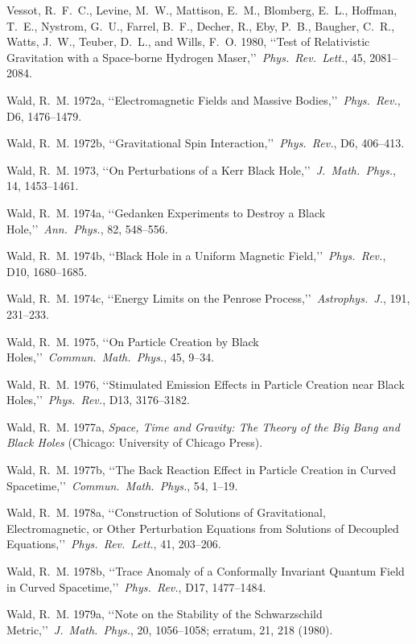 \item Vessot, R.~F.~C., Levine, M.~W., Mattison, E.~M., Blomberg, E.~L., Hoffman, T.~E., Nystrom, G.~U., Farrel, B.~F., Decher, R., Eby, P.~B., Baugher, C.~R., Watts, J.~W., Teuber, D.~L., and Wills, F.~O. 1980, \lq\lq Test of Relativistic Gravitation with a Space-borne Hydrogen Maser,\rq\rq\ \emph{Phys.\ Rev.\ Lett.}, 45, 2081--2084.
\item Wald, R.~M. 1972a, \lq\lq Electromagnetic Fields and Massive Bodies,\rq\rq\ \emph{Phys.\ Rev.}, D6, 1476--1479.
\item Wald, R.~M. 1972b, \lq\lq Gravitational Spin Interaction,\rq\rq\ \emph{Phys.\ Rev.}, D6, 406--413.
\item Wald, R.~M. 1973, \lq\lq On Perturbations of a Kerr Black Hole,\rq\rq\ \emph{J.\ Math.\ Phys.}, 14, 1453--1461.
\item Wald, R.~M. 1974a, \lq\lq Gedanken Experiments to Destroy a Black Hole,\rq\rq\ \emph{Ann.\ Phys.}, 82, 548--556.
\item Wald, R.~M. 1974b, \lq\lq Black Hole in a Uniform Magnetic Field,\rq\rq\ \emph{Phys.\ Rev.}, D10, 1680--1685.
\item Wald, R.~M. 1974c, \lq\lq Energy Limits on the Penrose Process,\rq\rq\ \emph{Astrophys.\ J.}, 191, 231--233.
\item Wald, R.~M. 1975, \lq\lq On Particle Creation by Black Holes,\rq\rq\ \emph{Commun.\ Math.\ Phys.}, 45, 9--34.
\item Wald, R.~M. 1976, \lq\lq Stimulated Emission Effects in Particle Creation near Black Holes,\rq\rq\ \emph{Phys.\ Rev.}, D13, 3176--3182.
\item Wald, R.~M. 1977a, \emph{Space, Time and Gravity: The Theory of the Big Bang and Black Holes} (Chicago: University of Chicago Press).
\item Wald, R.~M. 1977b, \lq\lq The Back Reaction Effect in Particle Creation in Curved Spacetime,\rq\rq\ \emph{Commun.\ Math.\ Phys.}, 54, 1--19.
\item Wald, R.~M. 1978a, \lq\lq Construction of Solutions of Gravitational, Electromagnetic, or Other Perturbation Equations from Solutions of Decoupled Equations,\rq\rq\ \emph{Phys.\ Rev.\ Lett.}, 41, 203--206.
\item Wald, R.~M. 1978b, \lq\lq Trace Anomaly of a Conformally Invariant Quantum Field in Curved Spacetime,\rq\rq\ \emph{Phys.\ Rev.}, D17, 1477--1484.
\item Wald, R.~M. 1979a, \lq\lq Note on the Stability of the Schwarzschild Metric,\rq\rq\ \emph{J.\ Math.\ Phys.}, 20, 1056--1058; erratum, 21, 218 (1980).
